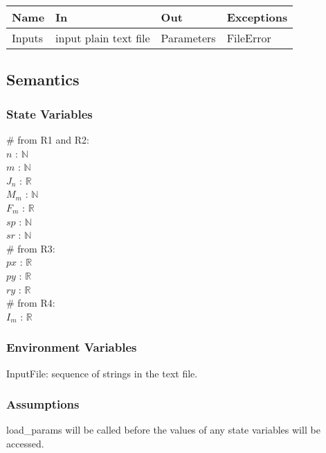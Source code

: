 \documentclass[12pt, titlepage]{article}
\begin{document}
\begin{center}
\begin{tabular}{p{2cm} p{4cm} p{4cm} p{2cm}}
\hline
\textbf{Name} & \textbf{In} & \textbf{Out} & \textbf{Exceptions} \\
\hline
Inputs & input plain text file & Parameters & FileError \\
\hline
\end{tabular}
\end{center}

\subsection{Semantics}
\subsubsection{State Variables}
$\#$ from R1 and R2:\\
$n$ : $\mathbb{N}$ \\
$m$ : $\mathbb{N}$ \\
$J_n$ : $\mathbb{R}$ \\
$M_m$ : $\mathbb{N}$ \\
$F_m$ : $\mathbb{R}$ \\
$sp$ : $\mathbb{N}$ \\
$sr$ : $\mathbb{N}$ \\
\newline
$\#$ from R3:\\
$px$ : $\mathbb{R}$ \\
$py$ : $\mathbb{R}$ \\
$ry$ : $\mathbb{R}$ \\
\newline
$\#$ from R4:\\
$I_m$ : $\mathbb{R}$ \\



\subsubsection{Environment Variables}

InputFile: sequence of strings in the text file.

\subsubsection{Assumptions}

load_params will be called before the values of any state variables will be accessed.
\end{document}
